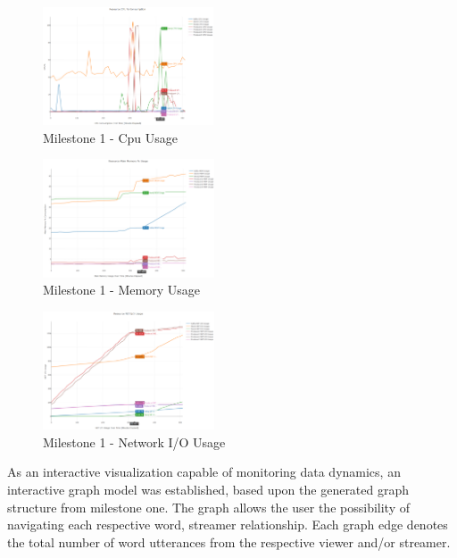\documentclass[10pt,conference]{IEEEtran}
\begin{document}
\begin{figure}[h]
    \centering
    \includegraphics[height=3.5cm,keepaspectratio]{Milestone1CpuUsage.png}
    \captionsetup                                 {justification=centering}
    \caption                                      {Milestone 1 - Cpu Usage}
    \label                                        {fig:Milestone1CpuUsage}
\end{figure}

\begin{figure}[h]
    \centering
    \includegraphics[height=3.5cm,keepaspectratio]{Milestone1MemoryUsage.png}
    \captionsetup                                 {justification=centering}
    \caption                                      {Milestone 1 - Memory Usage}
    \label                                        {fig:Milestone1MemoryUsage}
\end{figure}

\begin{figure}[h]
    \centering
    \includegraphics[height=3.5cm,keepaspectratio]{Milestone1NetUsage.png}
    \captionsetup                                 {justification=centering}
    \caption                                      {Milestone 1 - Network I/O Usage}
    \label                                        {fig:Milestone1NetUsage}
\end{figure}

As an interactive visualization capable of monitoring data dynamics, an interactive graph model was established, based upon the generated graph structure from milestone one. The graph allows the user the possibility of navigating each respective word, streamer relationship. Each graph edge denotes the total number of word utterances from the respective viewer and/or streamer.
\end{document}
